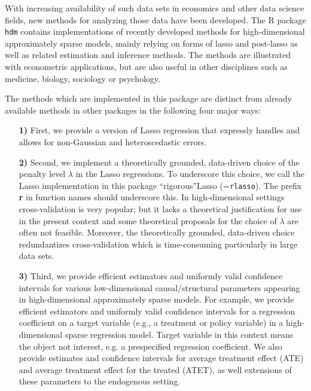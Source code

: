 \documentclass{amsart}\usepackage[]{graphicx}\usepackage[]{color}
\newcommand{\Rpackage}[1]{{\texttt{#1}}}
\newcommand{\R}{{\normalfont\textsf{R }}{}}
\newcommand{\code}[1]{\texttt{#1}}
\begin{document}
With increasing availability of such data sets in economics and other data science fields, new methods for analyzing those data have been developed. The \R package \Rpackage{hdm} contains implementations of recently developed methods for high-dimensional approximately sparse models, mainly relying on forms of lasso and post-lasso as well as related estimation and inference methods.  The methods are illustrated with econometric applications, but are also useful in other  disciplines such as medicine, biology, sociology or psychology. 

The methods which are implemented in this package are distinct from already available methods in other packages in the following four major ways: 
\begin{itemize} 


\item[\textbf{1)}] First, we provide a version of Lasso regression that expressly handles and allows for non-Gaussian and heteroscedastic errors.

\item[\textbf{2)}] Second, we implement a theoretically grounded, data-driven choice of the penalty level $\lambda$ in the Lasso regressions. To underscore this choice,  we call the Lasso implementation in this package \textquotedblleft rigorous\textquotedblright Lasso (=\code{rlasso}). The prefix \textbf{r} in function names should underscore this. In high-dimensional settings cross-validation is very popular; but it lacks a theoretical justification for use in the present context and some theoretical proposals for the choice of $\lambda$ are often not feasible. Moreover, the theoretically grounded, data-driven choice redundantizes cross-validation which is time-consuming particularly in large data sets.  

\item[\textbf{3)}] Third, we provide efficient estimators and  uniformly valid confidence intervals for various low-dimensional causal/structural parameters  appearing in high-dimensional approximately sparse models. For example, we provide efficient estimators and uniformly valid confidence intervals for a regression coefficient on a target variable (e.g., a treatment or policy variable) in a high-dimensional sparse regression model. Target variable in this context means the object not interest, e.g. a prespecified regression coefficient. We also provide estimates and confidence intervals for average treatment effect (ATE) and average treatment effect for the treated (ATET),  as well  extensions of these parameters to the endogenous setting.


\end{itemize}
\end{document}

